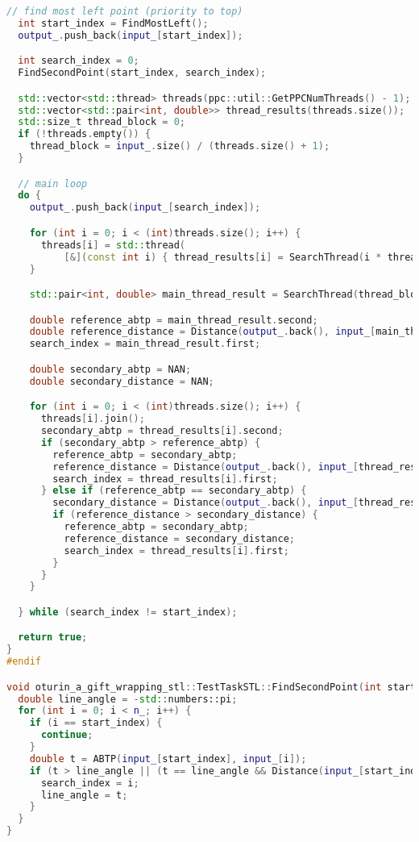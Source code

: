 \documentclass[12pt,a4paper]{extarticle}
\begin{document}
\begin{lstlisting}[language=C++]
  // find most left point (priority to top)
  int start_index = FindMostLeft();
  output_.push_back(input_[start_index]);

  int search_index = 0;
  FindSecondPoint(start_index, search_index);

  std::vector<std::thread> threads(ppc::util::GetPPCNumThreads() - 1);  // -1 because main thread will not be here
  std::vector<std::pair<int, double>> thread_results(threads.size());
  std::size_t thread_block = 0;
  if (!threads.empty()) {
    thread_block = input_.size() / (threads.size() + 1);
  }

  // main loop
  do {
    output_.push_back(input_[search_index]);

    for (int i = 0; i < (int)threads.size(); i++) {
      threads[i] = std::thread(
          [&](const int i) { thread_results[i] = SearchThread(i * thread_block, (i + 1) * thread_block); }, i);
    }

    std::pair<int, double> main_thread_result = SearchThread(thread_block * threads.size(), input_.size());

    double reference_abtp = main_thread_result.second;
    double reference_distance = Distance(output_.back(), input_[main_thread_result.first]);
    search_index = main_thread_result.first;

    double secondary_abtp = NAN;
    double secondary_distance = NAN;

    for (int i = 0; i < (int)threads.size(); i++) {
      threads[i].join();
      secondary_abtp = thread_results[i].second;
      if (secondary_abtp > reference_abtp) {
        reference_abtp = secondary_abtp;
        reference_distance = Distance(output_.back(), input_[thread_results[i].first]);
        search_index = thread_results[i].first;
      } else if (reference_abtp == secondary_abtp) {
        secondary_distance = Distance(output_.back(), input_[thread_results[i].first]);
        if (reference_distance > secondary_distance) {
          reference_abtp = secondary_abtp;
          reference_distance = secondary_distance;
          search_index = thread_results[i].first;
        }
      }
    }

  } while (search_index != start_index);

  return true;
}
#endif

void oturin_a_gift_wrapping_stl::TestTaskSTL::FindSecondPoint(int start_index, int &search_index) {
  double line_angle = -std::numbers::pi;
  for (int i = 0; i < n_; i++) {
    if (i == start_index) {
      continue;
    }
    double t = ABTP(input_[start_index], input_[i]);
    if (t > line_angle || (t == line_angle && Distance(input_[start_index], input_[i]) < Distance(input_[start_index], input_[search_index]))) {
      search_index = i;
      line_angle = t;
    }
  }
}


\end{lstlisting}
\end{document}
